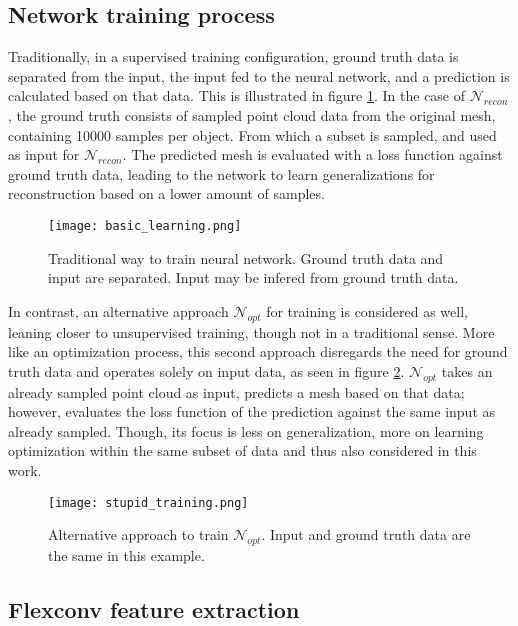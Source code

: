    \subsection{Network training process}
   \label{trainings}
   Traditionally, in a supervised training configuration, ground truth data is separated from the input, the input fed to the neural network,
   and a prediction is calculated based on that data. This is illustrated in figure \ref{fig:training1}. In the case of $\mathcal{N}_{recon}$, the ground
   truth consists of sampled point cloud data from the original mesh, containing 10000 samples per object. From which a subset is sampled, 
   and used as input for $\mathcal{N}_{recon}$. The predicted mesh is evaluated with a loss function against ground truth data, leading to 
   the network to learn generalizations for reconstruction based on a lower amount of samples.

   \begin{figure}
      \centering
      \texttt{[image: basic\_learning.png]}
      \caption{Traditional way to train neural network. Ground truth data and input are separated. Input may be infered from ground truth data.} \label{fig:training1}
    \end{figure}

   In contrast, an alternative approach $\mathcal{N}_{opt}$ for training is considered as well, leaning closer to unsupervised training, though not in a traditional sense.
   More like an optimization process, this second approach disregards the need for ground truth data and operates solely on input data, as seen in
   figure \ref{fig:training2}. $\mathcal{N}_{opt}$ takes an already sampled point cloud as input, predicts a mesh based on that data; however, evaluates the 
   loss function of the prediction against the same input as already sampled.
   Though, its focus is less on generalization, more on learning optimization within the same subset of data and thus also considered in this work.

   \begin{figure}[htbp]
   \centering
   \texttt{[image: stupid\_training.png]}
   \caption{Alternative approach to train $\mathcal{N}_{opt}$. Input and ground truth data are the same in this example.} \label{fig:training2}
   \end{figure}

\subsection{Flexconv feature extraction}
\label{fconv}

